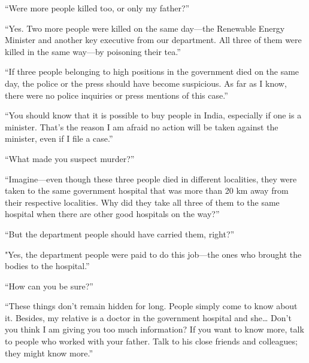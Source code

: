 “Were more people killed too, or only my father?”

“Yes. Two more people were killed on the same day—the Renewable Energy
Minister and another key executive from our department. All three of them were
killed in the same way—by poisoning their tea.”

“If three people belonging to high positions in the government died on the same
day, the police or the press should have become suspicious. As far as I know,
there were no police inquiries or press mentions of this case.”

“You should know that it is possible to buy people in India, especially if one
is a minister. That's the reason I am afraid no action will be taken against the
minister, even if I file a case.”

“What made you suspect murder?”

“Imagine—even though these three people died in different localities, they
were taken to the same government hospital that was more than 20 km away from
their respective localities. Why did they take all three of them to the same
hospital when there are other good hospitals on the way?”

“But the department people should have carried them, right?”

"Yes, the department people were paid to do this job—the ones who brought the
bodies to the hospital.”

“How can you be sure?”

“These things don't remain hidden for long. People simply come to know about it.
Besides, my relative is a doctor in the government hospital and she… Don't
you think I am giving you too much information? If you want to know more, talk
to people who worked with your father. Talk to his close friends and colleagues; they might know more.”
